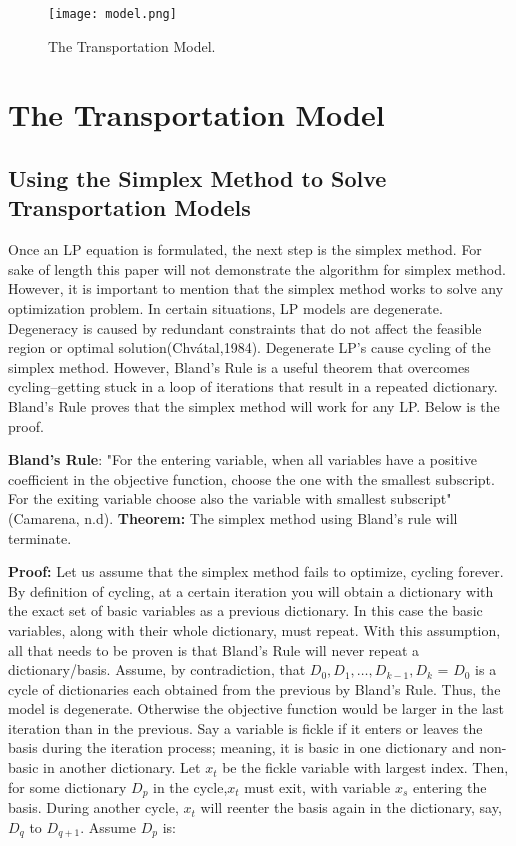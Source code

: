 \documentclass{article}
\begin{document}
\begin{figure}
[h]
\centering
\texttt{[image: model.png]}
\caption{\label{fig:frog}The Transportation Model.}
\end{figure}

\section{The Transportation Model}

\subsection{Using the Simplex Method to Solve Transportation Models}

Once an LP equation is formulated, the next step is the simplex method. For sake of length this paper will not demonstrate the algorithm for simplex method. However, it is important to mention that the simplex method works to solve any optimization problem. In certain situations, LP models are degenerate. Degeneracy is caused by redundant constraints that do not affect the feasible region or optimal solution(Chvátal,1984). Degenerate LP's cause cycling of the simplex method. However, Bland's Rule is a useful theorem that overcomes cycling--getting stuck in a loop of iterations that result in a repeated dictionary. Bland's Rule proves that the simplex method will work for any LP. Below is the proof.
\newline

\textbf{Bland’s Rule}: "For the entering variable, when all variables have a positive coefficient in the objective function, choose the one with the smallest subscript. For the exiting variable choose also the variable with smallest subscript"(Camarena, n.d).
\newline
\textbf{Theorem:} The simplex method using Bland’s rule will terminate.
\newline

\textbf{Proof:}
 Let us assume that the simplex method fails to optimize, cycling forever. By definition of cycling, at a certain iteration you will obtain a dictionary with the exact set of basic variables as a previous dictionary. In this case the basic variables, along with their whole dictionary, must repeat. With this assumption, all that needs to be proven is that Bland’s Rule will never repeat a dictionary/basis. Assume, by contradiction, that $D_{0},D_1,\dots,D_{k-1},D_k$ = $D_0$ is a cycle of dictionaries each obtained from the previous by Bland’s Rule. Thus, the model is degenerate. Otherwise the objective function would be larger in the last iteration than in the previous. Say a variable is fickle if it enters or leaves the basis during the iteration process; meaning, it is basic in one dictionary and non-basic in another dictionary. Let $x_t$ be the fickle variable with largest index. Then, for some dictionary $D_p$ in the cycle,$x_t$ 
 must exit, with variable $x_s$ entering the basis. During another cycle, $x_t$ will reenter the basis again in the dictionary, say, $D_q$ to $D_{q+1}$. 
 Assume $D_p$ is:
 
\end{document}
